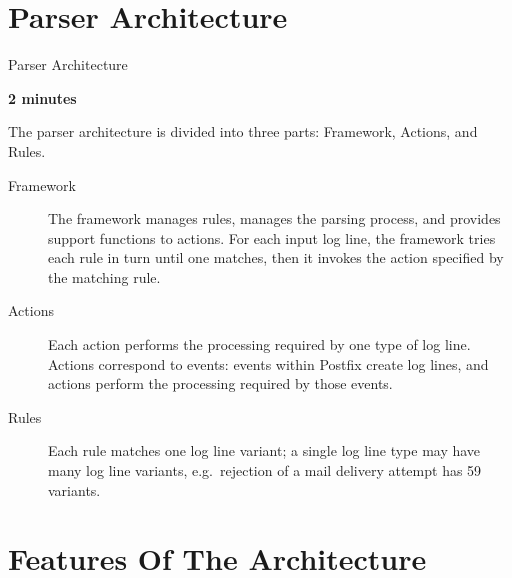 \documentclass{beamer}
\newcommand{\timingnote}[1]{%
    \textbf{#1}%
}
\begin{document}
\section{Parser Architecture}

\begin{frame}{Parser Architecture}

    \timingnote{2 minutes}

    The parser architecture is divided into three parts: Framework,
    Actions, and Rules.

    \begin{description}

        \item [Framework] The framework manages rules, manages the parsing
            process, and provides support functions to actions.  For each
            input log line, the framework tries each rule in turn until one
            matches, then it invokes the action specified by the matching
            rule.

        \item [Actions] Each action performs the processing required by one
            \alert{type} of log line.  Actions correspond to events: events
            within Postfix create log lines, and actions perform the
            processing required by those events.

        \item [Rules] Each rule matches one log line \alert{variant}; a
            single log line \alert{type} may have many log line
            \alert{variants}, e.g.\ rejection of a mail delivery attempt
            has 59 variants.

    \end{description}

\end{frame}

\section{Features Of The Architecture}
\end{document}
